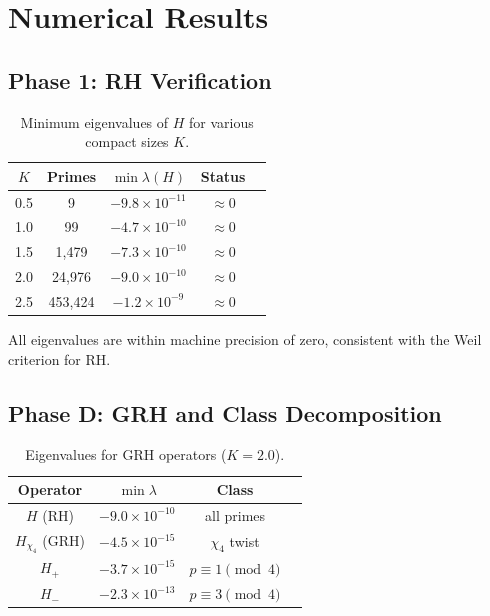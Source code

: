 \documentclass[11pt,a4paper]{article}
\theoremstyle{definition}
\begin{document}
\section{Numerical Results}

\subsection{Phase 1: RH Verification}

\begin{table}[h]
\centering
\caption{Minimum eigenvalues of $H$ for various compact sizes $K$.}
\begin{tabular}{ccccc}
\toprule
$K$ & Primes & $\min\lambda(H)$ & Status \\
\midrule
0.5 & 9 & $-9.8 \times 10^{-11}$ & $\approx 0$ \\
1.0 & 99 & $-4.7 \times 10^{-10}$ & $\approx 0$ \\
1.5 & 1,479 & $-7.3 \times 10^{-10}$ & $\approx 0$ \\
2.0 & 24,976 & $-9.0 \times 10^{-10}$ & $\approx 0$ \\
2.5 & 453,424 & $-1.2 \times 10^{-9}$ & $\approx 0$ \\
\bottomrule
\end{tabular}
\end{table}

All eigenvalues are within machine precision of zero, consistent with the Weil criterion for RH.

\subsection{Phase D: GRH and Class Decomposition}

\begin{table}[h]
\centering
\caption{Eigenvalues for GRH operators ($K = 2.0$).}
\begin{tabular}{cccc}
\toprule
Operator & $\min\lambda$ & Class \\
\midrule
$H$ (RH) & $-9.0 \times 10^{-10}$ & all primes \\
$H_{\chi_4}$ (GRH) & $-4.5 \times 10^{-15}$ & $\chi_4$ twist \\
$H_+$ & $-3.7 \times 10^{-15}$ & $p \equiv 1 \pmod{4}$ \\
$H_-$ & $-2.3 \times 10^{-13}$ & $p \equiv 3 \pmod{4}$ \\
\bottomrule
\end{tabular}
\end{table}
\end{document}
